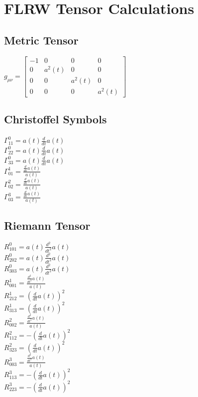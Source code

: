 \documentclass{article}
\begin{document}
\section*{FLRW Tensor Calculations}
\subsection*{Metric Tensor}
$g_{\mu\nu} = \left[\begin{matrix}-1 & 0 & 0 & 0\\0 & a^{2}{\left(t \right)} & 0 & 0\\0 & 0 & a^{2}{\left(t \right)} & 0\\0 & 0 & 0 & a^{2}{\left(t \right)}\end{matrix}\right]$

\subsection*{Christoffel Symbols}
$\Gamma^0_{11} = a{\left(t \right)} \frac{d}{d t} a{\left(t \right)}$\\
$\Gamma^0_{22} = a{\left(t \right)} \frac{d}{d t} a{\left(t \right)}$\\
$\Gamma^0_{33} = a{\left(t \right)} \frac{d}{d t} a{\left(t \right)}$\\
$\Gamma^1_{01} = \frac{\frac{d}{d t} a{\left(t \right)}}{a{\left(t \right)}}$\\
$\Gamma^2_{02} = \frac{\frac{d}{d t} a{\left(t \right)}}{a{\left(t \right)}}$\\
$\Gamma^3_{03} = \frac{\frac{d}{d t} a{\left(t \right)}}{a{\left(t \right)}}$\\
\subsection*{Riemann Tensor}
$R^0_{101} = a{\left(t \right)} \frac{d^{2}}{d t^{2}} a{\left(t \right)}$\\
$R^0_{202} = a{\left(t \right)} \frac{d^{2}}{d t^{2}} a{\left(t \right)}$\\
$R^0_{303} = a{\left(t \right)} \frac{d^{2}}{d t^{2}} a{\left(t \right)}$\\
$R^1_{001} = \frac{\frac{d^{2}}{d t^{2}} a{\left(t \right)}}{a{\left(t \right)}}$\\
$R^1_{212} = \left(\frac{d}{d t} a{\left(t \right)}\right)^{2}$\\
$R^1_{313} = \left(\frac{d}{d t} a{\left(t \right)}\right)^{2}$\\
$R^2_{002} = \frac{\frac{d^{2}}{d t^{2}} a{\left(t \right)}}{a{\left(t \right)}}$\\
$R^2_{112} = - \left(\frac{d}{d t} a{\left(t \right)}\right)^{2}$\\
$R^2_{323} = \left(\frac{d}{d t} a{\left(t \right)}\right)^{2}$\\
$R^3_{003} = \frac{\frac{d^{2}}{d t^{2}} a{\left(t \right)}}{a{\left(t \right)}}$\\
$R^3_{113} = - \left(\frac{d}{d t} a{\left(t \right)}\right)^{2}$\\
$R^3_{223} = - \left(\frac{d}{d t} a{\left(t \right)}\right)^{2}$\\
\end{document}
